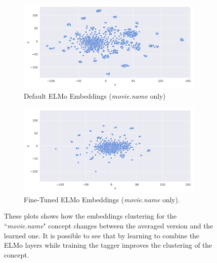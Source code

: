 \documentclass[11pt,a4paper]{article}
\begin{document}
\begin{figure}[t]
\begin{subfigure}{0.5\linewidth}
  \centering
  \includegraphics[width=\linewidth]{img/elmo-embeddings-not-trained-2D.png}
  \caption{Default ELMo Embeddings (\textit{movie.name} only)}
  \label{fig:sfig1}
\end{subfigure}%
\begin{subfigure}{0.5\linewidth}
  \centering
  \includegraphics[width=\linewidth]{img/elmo-embeddings-trained-2D.png}
  \caption{Fine-Tuned ELMo Embeddings (\textit{movie.name} only).}
  \label{fig:sfig2}
\end{subfigure}%
\caption{These plots shows how the embeddings clustering for the ``\textit{movie.name}" concept changes between the averaged version and the learned one. It is possible to see that by learning to combine the ELMo layers while training the tagger improves the clustering of the concept.}
\label{fig:fine-tuned-emb}
\end{figure}
\end{document}
